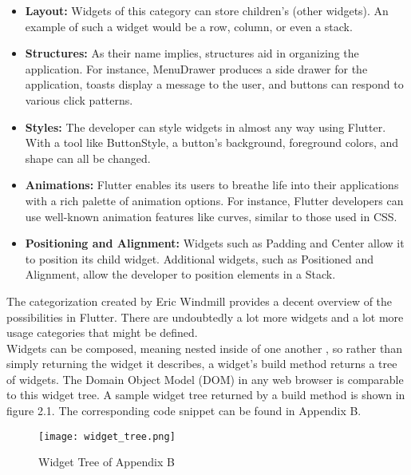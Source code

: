 \begin{itemize}
	\item \textbf{Layout:} 
	Widgets of this category can store children's (other widgets). An example of such a widget would be a row, column, or even a stack.  
	\item \textbf{Structures:} 
	As their name implies, structures aid in organizing the application.
	For instance, MenuDrawer produces a side drawer for the application, toasts display a message to the user, and buttons can respond to various click patterns. 
	\item \textbf{Styles:} 
	The developer can style widgets in almost any way using Flutter. With a tool like ButtonStyle, a button's background, foreground colors, and shape can all be changed.
	\item \textbf{Animations:} 
	Flutter enables its users to breathe life into their applications with a rich palette of animation options. For instance, Flutter developers can use well-known animation features like curves, similar to those used in CSS. 
	\item \textbf{Positioning and Alignment:} 
	Widgets such as Padding and Center allow it to position its child widget. Additional widgets, such as Positioned and Alignment, allow the developer to position elements in a Stack.
\end{itemize}
\noindent 
The categorization created by Eric Windmill provides a decent overview of the possibilities in Flutter. There are undoubtedly a lot more widgets and a lot more usage categories that might be defined.
\newline \\
Widgets can be composed, meaning nested inside of one another \cite[p. 61]{.flutterinaction}, so rather than simply returning the widget it describes, a widget's build method returns a tree of widgets. The Domain Object Model (DOM) in any web browser is comparable to this widget tree. A sample widget tree returned by a build method is shown in figure 2.1. The corresponding code snippet can be found in Appendix B.
\begin{figure}[H]
	\centering
	\texttt{[image: widget\_tree.png]}
	\caption[Widget Tree of Listing 2.1]{Widget Tree of Appendix B}
\end{figure}

